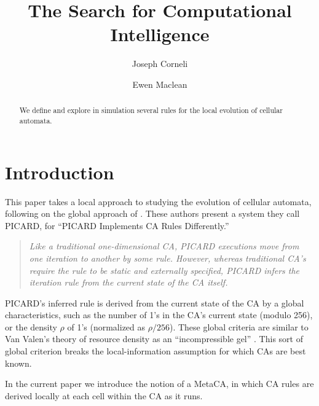 \documentclass{AISB2008}
\begin{document}
\title{The Search for Computational Intelligence}

\author{Joseph Corneli
\and
Ewen Maclean
}

\maketitle


\begin{abstract}
We define and explore in simulation several rules for the local
evolution of cellular automata.
\end{abstract}

\section{Introduction}

This paper takes a local approach to studying the evolution of
cellular automata, following on the global approach of
\cite{pavlic2014self}.  These authors present a system they call
PICARD, for ``PICARD Implements CA Rules Differently.''

\begin{quote}
\emph{Like a traditional one-dimensional CA, PICARD executions move
  from one iteration to another by some rule. However, whereas
  traditional CA's require the rule to be static and externally
  specified, PICARD infers the iteration rule from the current state
  of the CA itself.}
\end{quote}

PICARD's inferred rule is derived from the current state of the CA by
a global characteristics, such as the number of 1's in the CA's
current state (modulo 256), or the density $\rho$ of 1's (normalized
as $\rho/256$).  These global criteria are similar to Van Valen's
theory of resource density as an ``incompressible gel'' \cite{van1973new}.
This sort of global criterion breaks the local-information assumption
for which CAs are best known.

In the current paper we introduce the notion of a MetaCA, in which CA
rules are derived locally at each cell within the CA as it runs.
\end{document}
